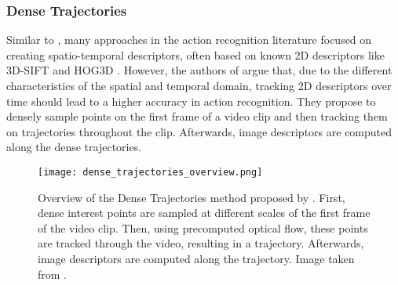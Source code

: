 \subsubsection{Dense Trajectories}
\label{sec:dense-trajectories}

Similar to \cite{laptev_learning_2008}, many approaches in the action recognition literature focused on creating spatio-temporal descriptors, often based on known 2D descriptors like 3D-SIFT \cite{scovanner_3d_sift} and HOG3D \cite{klaser_hog3d}.
However, the authors of \cite{wang_dense_2013} argue that, due to the different characteristics of the spatial and temporal domain, tracking 2D descriptors over time should lead to a higher accuracy in action recognition.
They propose to densely sample points on the first frame of a video clip and then tracking them on trajectories throughout the clip.
Afterwards, image descriptors are computed along the dense trajectories.

\begin{figure}[htb!]
    \centering
    \texttt{[image: dense\_trajectories\_overview.png]}
    \caption{Overview of the Dense Trajectories method proposed by \cite{wang_dense_2013}. First, dense interest points are sampled at different scales of the first frame of the video clip. Then, using precomputed optical flow, these points are tracked through the video, resulting in a trajectory. Afterwards, image descriptors are computed along the trajectory. Image taken from \cite{wang_dense_2013}. }
    \label{fig:dense-trajectories-overview}
\end{figure}

